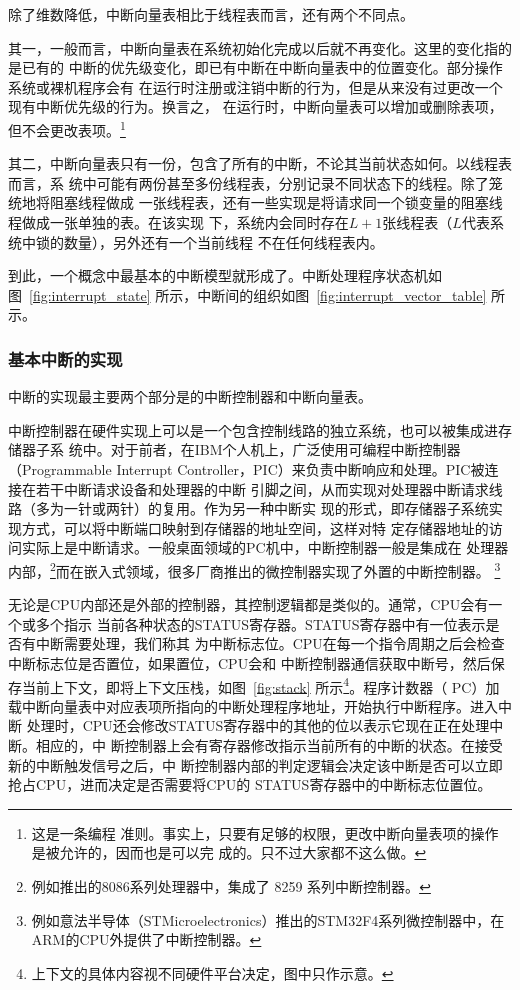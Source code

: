 除了维数降低，中断向量表相比于线程表而言，还有两个不同点。

其一，一般而言，中断向量表在系统初始化完成以后就不再变化。这里的变化指的是已有的
中断的优先级变化，即已有中断在中断向量表中的位置变化。部分操作系统或裸机程序会有
在运行时注册或注销中断的行为，但是从来没有过更改一个现有中断优先级的行为。换言之，
在运行时，中断向量表可以增加或删除表项，但不会更改表项。\footnote{这是一条编程
准则。事实上，只要有足够的权限，更改中断向量表项的操作是被允许的，因而也是可以完
成的。只不过大家都不这么做。}

其二，中断向量表只有一份，包含了所有的中断，不论其当前状态如何。以线程表而言，系
统中可能有两份甚至多份线程表，分别记录不同状态下的线程。除了笼统地将阻塞线程做成
一张线程表，还有一些实现是将请求同一个锁变量的阻塞线程做成一张单独的表。在该实现
下，系统内会同时存在$L+1$张线程表（$L$代表系统中锁的数量），另外还有一个当前线程
不在任何线程表内。

到此，一个概念中最基本的中断模型就形成了。中断处理程序状态机如图~\ref{fig:interrupt_state} 
所示，中断间的组织如图~\ref{fig:interrupt_vector_table} 所示。

\subsubsection{基本中断的实现}
\label{subsec:basic_hardware}

中断的实现最主要两个部分是的中断控制器和中断向量表。

中断控制器在硬件实现上可以是一个包含控制线路的独立系统，也可以被集成进存储器子系
统中。对于前者，在IBM个人机上，广泛使用可编程中断控制器（Programmable Interrupt 
Controller，PIC）来负责中断响应和处理。PIC被连接在若干中断请求设备和处理器的中断
引脚之间，从而实现对处理器中断请求线路（多为一针或两针）的复用。作为另一种中断实
现的形式，即存储器子系统实现方式，可以将中断端口映射到存储器的地址空间，这样对特
定存储器地址的访问实际上是中断请求。一般桌面领域的PC机中，中断控制器一般是集成在
处理器内部，\footnote{例如\intel{}推出的8086系列处理器中，集成了\intel{} 8259
系列中断控制器。}而在嵌入式领域，很多厂商推出的微控制器实现了外置的中断控制器。
\footnote{例如意法半导体（STMicroelectronics）推出的STM32F4系列微控制器中，在
ARM的CPU外提供了中断控制器。}

无论是CPU内部还是外部的控制器，其控制逻辑都是类似的。通常，CPU会有一个或多个指示
当前各种状态的STATUS寄存器。STATUS寄存器中有一位表示是否有中断需要处理，我们称其
为中断标志位。CPU在每一个指令周期之后会检查中断标志位是否置位，如果置位，CPU会和
中断控制器通信获取中断号，然后保存当前上下文，即将上下文压栈，如图~\ref{fig:stack} 
所示\footnote{上下文的具体内容视不同硬件平台决定，图中只作示意。}。程序计数器（
PC）加载中断向量表中对应表项所指向的中断处理程序地址，开始执行中断程序。进入中断
处理时，CPU还会修改STATUS寄存器中的其他的位以表示它现在正在处理中断。相应的，中
断控制器上会有寄存器修改指示当前所有的中断的状态。在接受新的中断触发信号之后，中
断控制器内部的判定逻辑会决定该中断是否可以立即抢占CPU，进而决定是否需要将CPU的
STATUS寄存器中的中断标志位置位。

